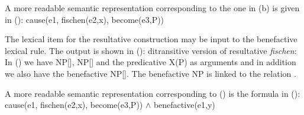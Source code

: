 A more readable semantic representation corresponding to the one in (b) is given in ():
\ea
cause(e1, fischen(e2,x), become(e3,P))
\z

The lexical item for the resultative construction may be input to the benefactive lexical rule. The
output is shown in ():
\ea 
ditransitive version of resultative \emph{fischen}:
\z
In () we have NP[\str], NP[\str] and the predicative X(P) as arguments and in addition we
also have the benefactive NP[\ldat]. The benefactive NP is linked to the  relation
.

A more readable semantic representation corresponding to () is the formula in ():
\ea
cause(e1, fischen(e2,x), become(e3,P)) $\wedge$ benefactive(e1,y)
\z


